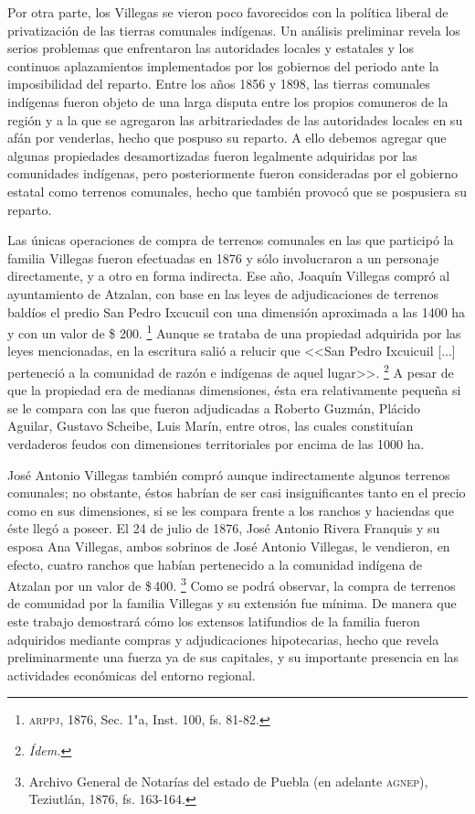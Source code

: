 \documentclass[14pt,twoside,final]{extbook} %
\let\oldfootnote\footnote
\renewcommand\footnote[1]{%
\oldfootnote{\hspace{1mm}#1}}
\begin{document}
Por otra parte, los Villegas se vieron poco favorecidos con la política liberal de privatización de las tierras comunales indígenas. Un análisis preliminar revela los serios problemas que enfrentaron las autoridades locales y estatales y los continuos aplazamientos implementados por los gobiernos del periodo ante la imposibilidad del reparto. Entre los años 1856 y 1898, las tierras comunales indígenas fueron objeto de una larga disputa entre los propios comuneros de la región y a la que se agregaron las arbitrariedades de las autoridades locales en su afán por venderlas, hecho que pospuso su reparto. A ello debemos agregar que algunas propiedades desamortizadas fueron legalmente adquiridas por las comunidades indígenas, pero posteriormente fueron consideradas por el gobierno estatal como terrenos comunales, hecho que también provocó que se pospusiera su reparto.

Las únicas operaciones de compra de terrenos comunales en las que participó la familia Villegas fueron efectuadas en 1876 y sólo involucraron a un personaje directamente, y a otro en forma indirecta. Ese año, Joaquín Villegas compró al ayuntamiento de Atzalan, con base en las leyes de adjudicaciones de terrenos baldíos el predio San Pedro Ixcucuil con una dimensión aproximada a las 1400 ha y con un valor de \$ 200.\footnote{\textsc{arppj}, 1876, Sec. 1"a, Inst. 100, fs. 81-82.} Aunque se trataba de una propiedad adquirida por las leyes mencionadas, en la escritura salió a relucir que <<San Pedro Ixcuicuil [...] perteneció a la comunidad de razón e indígenas de aquel lugar>>.\footnote{\em Ídem.} A pesar de que la propiedad era de medianas dimensiones, ésta era relativamente pequeña si se le compara con las que fueron adjudicadas a Roberto Guzmán, Plácido Aguilar, Gustavo Scheibe, Luis Marín, entre otros, las cuales constituían verdaderos feudos con dimensiones territoriales por encima de las 1000 ha.

José Antonio Villegas también compró aunque indirectamente algunos terrenos comunales; no obstante, éstos habrían de ser casi insignificantes tanto en el precio como en sus dimensiones, si se les compara frente a los ranchos y haciendas que éste llegó a poseer. El 24 de julio de 1876, José Antonio Rivera Franquis y su esposa Ana Villegas, ambos sobrinos de José Antonio Villegas, le vendieron, en efecto, cuatro ranchos que habían pertenecido a la comunidad indígena de Atzalan por un valor de \$\,400.\footnote{Archivo General de Notarías del estado de Puebla (en adelante \textsc{agnep}), Teziutlán, 1876, fs. 163-164.} Como se podrá observar, la compra de terrenos de comunidad por la familia Villegas y su extensión fue mínima. De manera que este trabajo demostrará cómo los extensos latifundios de la familia fueron adquiridos mediante compras y adjudicaciones hipotecarias, hecho que revela preliminarmente una fuerza ya de sus capitales, y su importante presencia en las actividades económicas del entorno regional.
\end{document}
